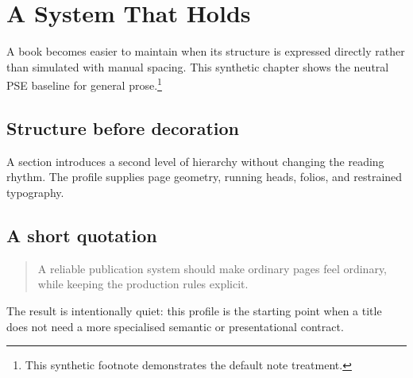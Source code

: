 \chapter{A System That Holds}
A book becomes easier to maintain when its structure is expressed directly rather than simulated with manual spacing. This synthetic chapter shows the neutral PSE baseline for general prose.\footnote{This synthetic footnote demonstrates the default note treatment.}

\section{Structure before decoration}
A section introduces a second level of hierarchy without changing the reading rhythm. The profile supplies page geometry, running heads, folios, and restrained typography.

\section{A short quotation}
\begin{quote}
A reliable publication system should make ordinary pages feel ordinary, while keeping the production rules explicit.
\end{quote}

The result is intentionally quiet: this profile is the starting point when a title does not need a more specialised semantic or presentational contract.

